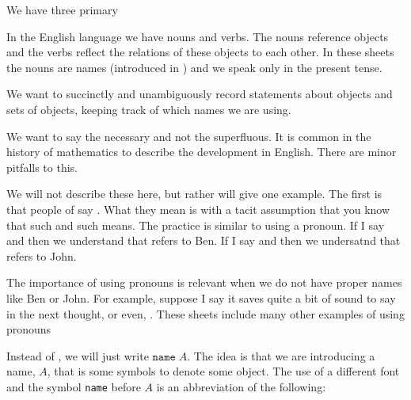\begin{account}[Example]
\end{account}

We have three primary

In the English language we have nouns and verbs.
The nouns reference objects and the verbs reflect the relations of these objects to each other.
In these sheets the nouns are names (introduced in ) and we speak only in the present tense.


We want to succinctly and unambiguously record statements about objects and sets of objects, keeping track of which names we are using.


We want to say the necessary and not the superfluous.
It is common in the history of mathematics to describe the development in English.
There are minor pitfalls to this.

We will not describe these here, but rather will give one example.
The first is that people of say .
What they mean is  with a tacit assumption that you know that such and such means.
The practice is similar to using a pronoun.
If I say  and then  we understand that  refers to Ben.
If I say  and then  we undersatnd that  refers to John.

The importance of using pronouns is relevant when we do not have proper names like Ben or John.
For example, suppose I say  it saves quite a bit of sound to say  in the next thought, or even, .
These sheets include many other examples of using pronouns

Instead of , we will just write $\texttt{name} \; A$.
The idea is that we are introducing a name, $A$, that is some symbols to denote some object.
The use of a different font and the symbol \texttt{name} before $A$ is an abbreviation of the following: 

